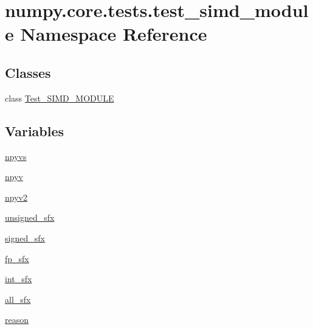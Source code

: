 \hypertarget{namespacenumpy_1_1core_1_1tests_1_1test__simd__module}{}\section{numpy.\+core.\+tests.\+test\+\_\+simd\+\_\+module Namespace Reference}
\label{namespacenumpy_1_1core_1_1tests_1_1test__simd__module}
\subsection*{Classes}
\begin{DoxyCompactItemize}
\item 
class \hyperlink{classnumpy_1_1core_1_1tests_1_1test__simd__module_1_1Test__SIMD__MODULE}{Test\+\_\+\+S\+I\+M\+D\+\_\+\+M\+O\+D\+U\+LE}
\end{DoxyCompactItemize}
\subsection*{Variables}
\begin{DoxyCompactItemize}
\item 
\hyperlink{namespacenumpy_1_1core_1_1tests_1_1test__simd__module_a3a8413da32c54918c2aca58b9d9a9187}{npyvs}
\item 
\hyperlink{namespacenumpy_1_1core_1_1tests_1_1test__simd__module_a53e32f8d1d5804315765ba158df6e2d0}{npyv}
\item 
\hyperlink{namespacenumpy_1_1core_1_1tests_1_1test__simd__module_a54b077f9a85b071b0cc306efafe356dd}{npyv2}
\item 
\hyperlink{namespacenumpy_1_1core_1_1tests_1_1test__simd__module_aba76dd4412e56d3abf7307cfa4990b50}{unsigned\+\_\+sfx}
\item 
\hyperlink{namespacenumpy_1_1core_1_1tests_1_1test__simd__module_a4b70ac51736afdb8c2526bf91e986c22}{signed\+\_\+sfx}
\item 
\hyperlink{namespacenumpy_1_1core_1_1tests_1_1test__simd__module_a840ef6d3d6764a207566594e8e6c6240}{fp\+\_\+sfx}
\item 
\hyperlink{namespacenumpy_1_1core_1_1tests_1_1test__simd__module_a3d19fcd1a885c461b4ea6d7511a08a95}{int\+\_\+sfx}
\item 
\hyperlink{namespacenumpy_1_1core_1_1tests_1_1test__simd__module_a3a31b7be3ff7dda629392e2fb719d873}{all\+\_\+sfx}
\item 
\hyperlink{namespacenumpy_1_1core_1_1tests_1_1test__simd__module_a6b7d0ed8d097d0e6ebfb929603c0609f}{reason}
\end{DoxyCompactItemize}


